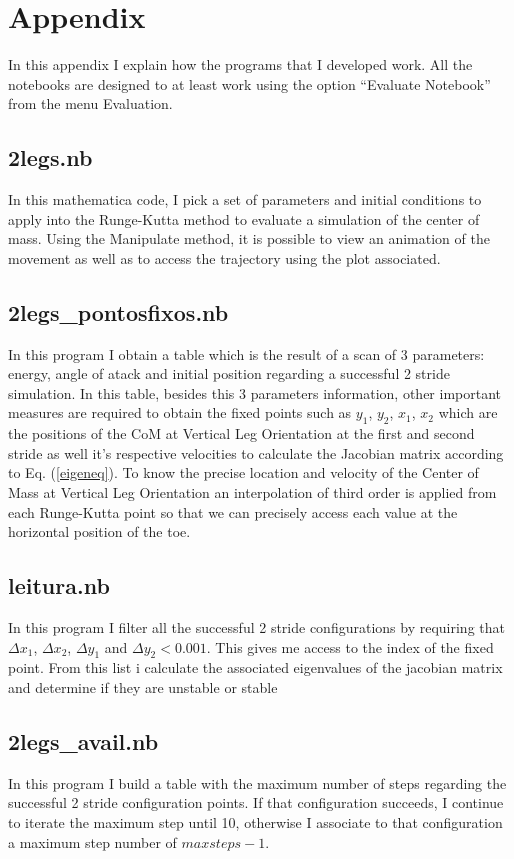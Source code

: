\section*{Appendix}
In this appendix I explain how the programs that I developed work. All the notebooks are designed to at least work using the option ``Evaluate Notebook'' from the menu Evaluation.



\subsection*{2legs.nb}


In this mathematica code, I pick a set of parameters and initial conditions to apply into the Runge-Kutta method to evaluate a simulation of the center of mass. Using the Manipulate method, it is possible to view an animation of the movement as well as to access the trajectory using the plot associated.


\subsection*{2legs\_pontosfixos.nb}


In this program I obtain a table which is the result of a scan of 3 parameters: energy, angle of atack and initial position regarding a successful 2 stride simulation. In this table, besides this 3 parameters information, other important measures are required to obtain the fixed points such as $y_1$, $y_2$, $x_1$, $x_2$ which are the positions of the CoM at Vertical Leg Orientation at the first and second stride as well it's respective velocities to calculate the Jacobian matrix according to Eq. (\ref{eigeneq}). To know the precise location and velocity of the Center of Mass at Vertical Leg Orientation an interpolation of third order is applied from each Runge-Kutta point so that we can precisely access each value at the horizontal position of the toe.



\subsection*{leitura.nb}

In this program I filter all the successful 2 stride configurations by requiring that $\Delta x_1$, $\Delta x_2$, $\Delta y_1$ and $\Delta y_2 < 0.001$. This gives me access to the index of the fixed point. From this list i calculate the associated eigenvalues of the jacobian matrix and determine if they are unstable or stable


\subsection*{2legs\_avail.nb}



In this program I build a table with the maximum number of steps regarding the successful 2 stride configuration points. If that configuration succeeds, I continue to iterate the maximum step until 10, otherwise I associate to that configuration a maximum step number of $maxsteps-1$.
